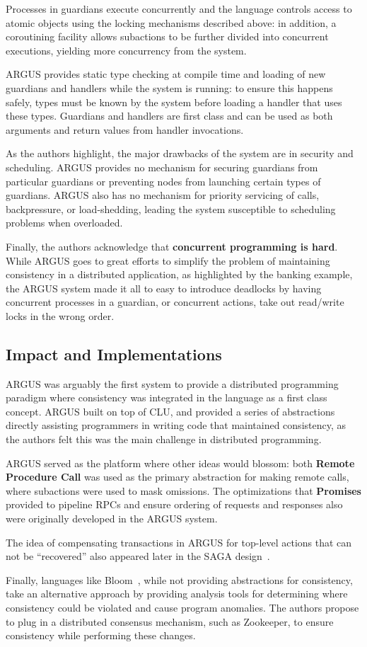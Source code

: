 Processes in guardians execute concurrently and the language controls access to atomic objects using the locking mechanisms described above: in addition, a coroutining facility allows subactions to be further divided into concurrent executions, yielding more concurrency from the system.

ARGUS provides static type checking at compile time and loading of new guardians and handlers while the system is running: to ensure this happens safely, types must be known by the system before loading a handler that uses these types.  Guardians and handlers are first class and can be used as both arguments and return values from handler invocations.

As the authors highlight, the major drawbacks of the system are in security and scheduling.  ARGUS provides no mechanism for securing  guardians from particular guardians or preventing nodes from launching certain types of guardians.  ARGUS also has no mechanism for priority servicing of calls, backpressure, or load-shedding, leading the system susceptible to scheduling problems when overloaded.

Finally, the authors acknowledge that \textbf{concurrent programming is hard}.  While ARGUS goes to great efforts to simplify the problem of maintaining consistency in a distributed application, as highlighted by the banking example, the ARGUS system made it all to easy to introduce deadlocks by having concurrent processes in a guardian, or concurrent actions, take out read/write locks in the wrong order.

\subsection{Impact and Implementations}

ARGUS was arguably the first system to provide a distributed programming paradigm where consistency was integrated in the language as a first class concept.  ARGUS built on top of CLU, and provided a series of abstractions directly assisting programmers in writing code that maintained consistency, as the authors felt this was the main challenge in distributed programming.

ARGUS served as the platform where other ideas would blossom: both \textbf{Remote Procedure Call} was used as the primary abstraction for making remote calls, where subactions were used to mask omissions.  The optimizations that \textbf{Promises} provided to pipeline RPCs and ensure ordering of requests and responses also were originally developed in the ARGUS system.

The idea of compensating transactions in ARGUS for top-level actions that can not be ``recovered'' also appeared later in the SAGA design~\cite{garcia1987sagas}.

Finally, languages like Bloom~\cite{alvaro2011consistency}, while not providing abstractions for consistency, take an alternative approach by providing analysis tools for determining where consistency could be violated and cause program anomalies.  The authors propose to plug in a distributed consensus mechanism, such as Zookeeper, to ensure consistency while performing these changes.

